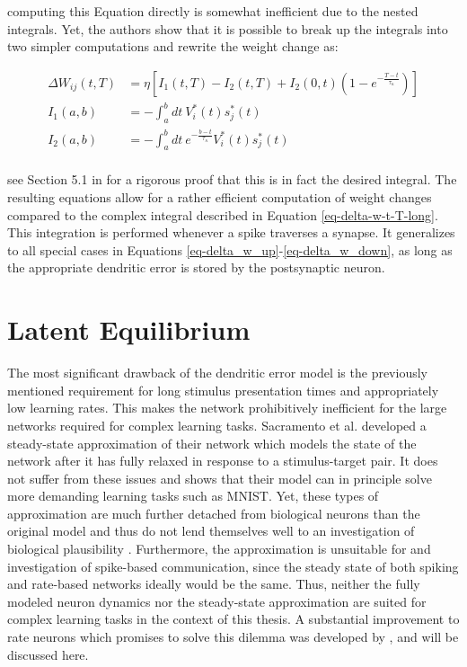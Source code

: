 computing this Equation directly is somewhat inefficient due to the nested integrals. Yet, the authors show that it is
possible to break up the integrals into two simpler computations and rewrite the weight change as:


\begin{align}
  \Delta W_{ij}(t, T) & = \eta \left[ I_1 (t, T) - I_2(t,T) + I_2(0,t)\left( 1- e^{-\frac{T-t}{\tau_\kappa}} \right) \right]\label{eq-proof-start} \\
  I_1(a, b)           & = -\int_{a}^{b} dt \ V_i^\ast (t) s_j^\ast (t)                                                                             \\
  I_2(a, b)           & = -\int_{a}^{b} dt \ e^{-\frac{b-t}{\tau_\kappa}} V_i^\ast (t) s_j^\ast (t)\label{eq-proof-end}                            \\
\end{align}

see Section 5.1 in \citep{Stapmanns2021} for a rigorous proof that this is in fact the desired integral. The resulting
equations allow for a rather efficient computation of weight changes compared to the complex integral described in
Equation \ref{eq-delta-w-t-T-long}. This integration is performed whenever a spike traverses a synapse. It generalizes
to all special cases in Equations \ref{eq-delta_w_up}-\ref{eq-delta_w_down}, as long as the appropriate dendritic error
is stored by the postsynaptic neuron.

\section{Latent Equilibrium}\label{sec-latent-eq}

The most significant drawback of the dendritic error model is the previously mentioned requirement for long stimulus
presentation times and appropriately low learning rates. This makes the network prohibitively inefficient for the large
networks required for complex learning tasks. Sacramento et al. developed a steady-state approximation of their network
which models the state of the network after it has fully relaxed in response to a stimulus-target pair. It does not
suffer from these issues and shows that their model can in principle solve more demanding learning tasks such as MNIST.
Yet, these types of approximation are much further detached from biological neurons than the original model and thus do
not lend themselves well to an investigation of biological plausibility \citep{Gerstner2009}. Furthermore, the
approximation is unsuitable for and investigation of spike-based communication, since the steady state of both spiking
and rate-based networks ideally would be the same. Thus, neither the fully modeled neuron dynamics nor the steady-state
approximation are suited for complex learning tasks in the context of this thesis. A substantial improvement to rate
neurons which promises to solve this dilemma was developed by \citep{Haider2021}, and will be discussed here.

